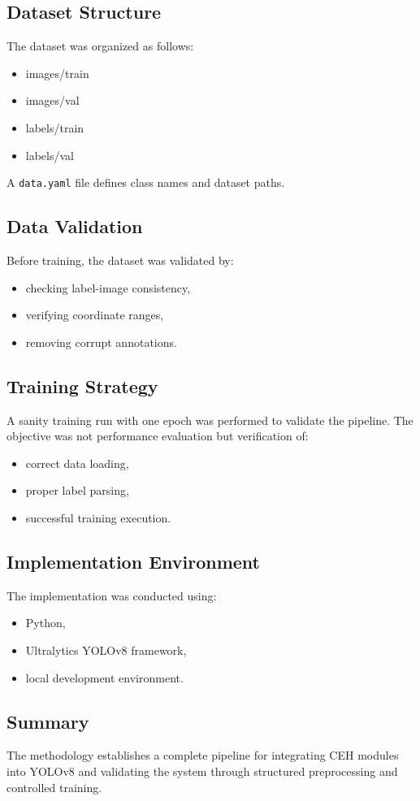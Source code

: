 \documentclass[12pt]{article}
\begin{document}
\subsection{Dataset Structure}

The dataset was organized as follows:
\begin{itemize}
    \item images/train
    \item images/val
    \item labels/train
    \item labels/val
\end{itemize}

A \texttt{data.yaml} file defines class names and dataset paths.

\subsection{Data Validation}

Before training, the dataset was validated by:
\begin{itemize}
    \item checking label-image consistency,
    \item verifying coordinate ranges,
    \item removing corrupt annotations.
\end{itemize}

\subsection{Training Strategy}

A sanity training run with one epoch was performed to validate the pipeline. The objective was not performance evaluation but verification of:
\begin{itemize}
    \item correct data loading,
    \item proper label parsing,
    \item successful training execution.
\end{itemize}

\subsection{Implementation Environment}

The implementation was conducted using:
\begin{itemize}
    \item Python,
    \item Ultralytics YOLOv8 framework,
    \item local development environment.
\end{itemize}

\subsection{Summary}

The methodology establishes a complete pipeline for integrating CEH modules into YOLOv8 and validating the system through structured preprocessing and controlled training.

\newpage
\printbibliography
\end{document}
